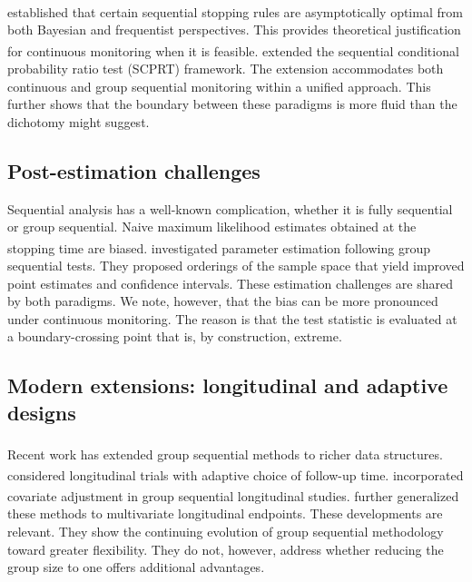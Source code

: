 \documentclass[
  11pt,
]{article}
\begin{document}
\textsuperscript{} established that certain sequential
stopping rules are asymptotically optimal from both
Bayesian and frequentist perspectives. This provides
theoretical justification for continuous monitoring
when it is feasible.\textsuperscript{} extended the
sequential conditional probability ratio test (SCPRT)
framework. The extension accommodates both continuous
and group sequential monitoring within a unified
approach. This further shows that the boundary between
these paradigms is more fluid than the dichotomy might
suggest.

\subsection{Post-estimation challenges}\label{post-estimation-challenges}

Sequential analysis has a well-known complication,
whether it is fully sequential or group sequential.
Naive maximum likelihood estimates obtained at the
stopping time are biased.\textsuperscript{} investigated
parameter estimation following group sequential tests.
They proposed orderings of the sample space that yield
improved point estimates and confidence intervals.
These estimation challenges are shared by both
paradigms. We note, however, that the bias can be more
pronounced under continuous monitoring. The reason is
that the test statistic is evaluated at a
boundary-crossing point that is, by construction,
extreme.

\subsection{Modern extensions: longitudinal and adaptive designs}\label{modern-extensions-longitudinal-and-adaptive-designs}

Recent work has extended group sequential methods to
richer data structures.\textsuperscript{} considered
longitudinal trials with adaptive choice of follow-up
time.\textsuperscript{}
incorporated covariate adjustment in group sequential
longitudinal studies.\textsuperscript{} further
generalized these methods to multivariate longitudinal
endpoints. These developments are relevant. They show
the continuing evolution of group sequential
methodology toward greater flexibility. They do not,
however, address whether reducing the group size to
one offers additional advantages.
\end{document}
